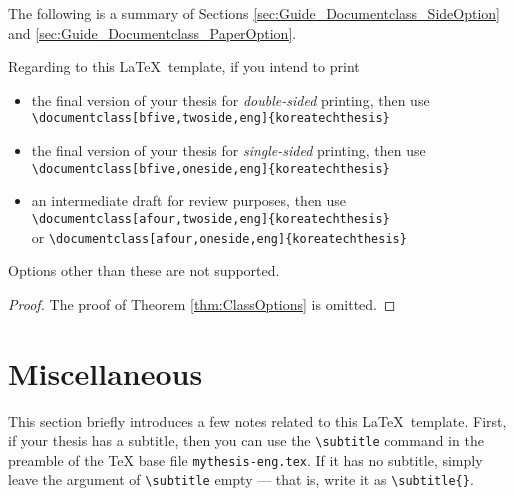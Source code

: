The following is a summary of Sections \ref{sec:Guide_Documentclass_SideOption} and \ref{sec:Guide_Documentclass_PaperOption}.

\begin{thm}	\label{thm:ClassOptions}
	Regarding to this \LaTeX~template, if you intend to print
	\begin{itemize}
		\item	the final version of your thesis for \emph{double-sided} printing, then use\\
				\verb|\documentclass[bfive,twoside,eng]{koreatechthesis}|
		\item 	the final version of your thesis for \emph{single-sided} printing, then use\\
				\verb|\documentclass[bfive,oneside,eng]{koreatechthesis}|
		\item 	an intermediate draft for review purposes, then use\\
				\verb|\documentclass[afour,twoside,eng]{koreatechthesis}|\\
				or \verb|\documentclass[afour,oneside,eng]{koreatechthesis}|
	\end{itemize}	
	Options other than these are not supported.
\end{thm}

\begin{proof}
	The proof of Theorem \ref{thm:ClassOptions} is omitted.
\end{proof}



\section{Miscellaneous}	\label{sec:Guide_Etc}

This section briefly introduces a few notes related to this \LaTeX~template.
First, if your thesis has a subtitle, then you can use the \verb|\subtitle| command in the preamble of the TeX base file \verb|mythesis-eng.tex|.
If it has no subtitle, simply leave the argument of \verb|\subtitle| empty --- that is, write it as \verb|\subtitle{}|.

